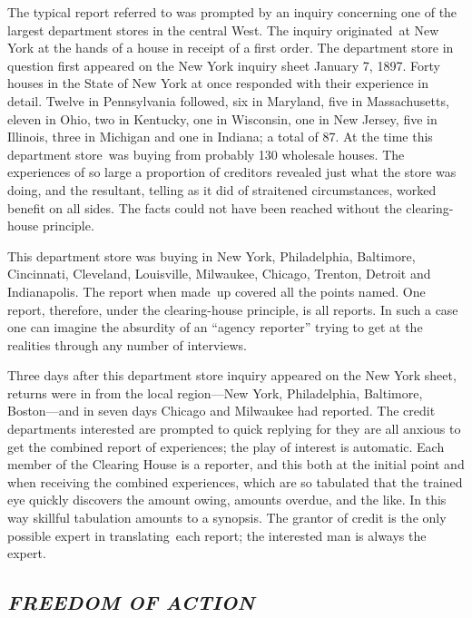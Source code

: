 \documentclass[openany,nobib]{tufte-book}
\begin{document}
The typical report referred to was prompted by an inquiry concerning one
of the largest department stores in the central West. The inquiry
originated~at New York at the hands of a house in receipt of a first
order. The department store in question first appeared on the New York
inquiry sheet January 7, 1897. Forty houses in the State of New York at
once responded with their experience in detail. Twelve in Pennsylvania
followed, six in Maryland, five in Massachusetts, eleven in Ohio, two in
Kentucky, one in Wisconsin, one in New Jersey, five in Illinois, three
in Michigan and one in Indiana; a total of 87. At the time this
department store~was buying from probably 130 wholesale houses. The
experiences of so large a proportion of creditors revealed just what the
store was doing, and the resultant, telling as it did of straitened
circumstances, worked benefit on all sides. The facts could not have
been reached without the clearing-house principle.~

This department store was buying in New York, Philadelphia, Baltimore,
Cincinnati, Cleveland, Louisville, Milwaukee, Chicago, Trenton, Detroit
and Indianapolis. The report when made~up covered all the points named.
One report, therefore, under the clearing-house principle, is all
reports. In such a case one can imagine the absurdity of an ``agency
reporter'' trying to get at the realities through any number of
interviews.~

Three days after this department store inquiry appeared on the New York
sheet, returns were in from the local region---New York, Philadelphia,
Baltimore, Boston---and in seven days Chicago and Milwaukee had
reported. The credit departments interested are prompted to quick
replying for they are all anxious to get the combined report of
experiences; the play of interest is automatic. Each member of the
Clearing House is a reporter, and this both at the initial point and
when receiving the combined experiences, which are so tabulated that the
trained eye quickly discovers the amount owing, amounts overdue, and the
like. In this way skillful tabulation amounts to a synopsis. The grantor
of credit is the only possible expert in translating~each report; the
interested man is always the expert.~~

\hypertarget{freedom-of-action}{%
\subsection{\texorpdfstring{\emph{FREEDOM OF
ACTION}}{FREEDOM OF ACTION}}\label{freedom-of-action}}
\end{document}
